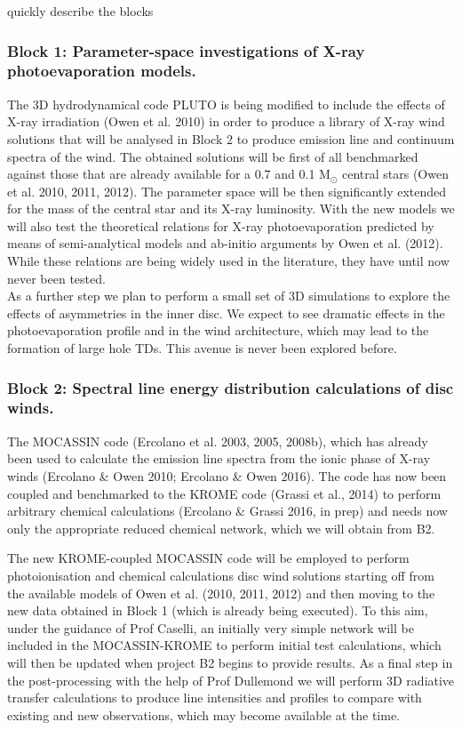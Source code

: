 \documentclass[10pt,fleqn,twoside]{article}
\begin{document}
{\color{red} quickly describe the blocks}

\subsubsection{Block 1: Parameter-space investigations of X-ray
  photoevaporation models.}

The 3D hydrodynamical code PLUTO is being modified to include the
effects of X-ray irradiation (Owen et al. 2010) in order to produce a
library of X-ray wind solutions that will be analysed in Block 2
to produce emission line and continuum spectra of the
wind. The obtained solutions will be first of all benchmarked against
those that are already available for a 0.7 and 0.1 M$_\odot$ central
stars (Owen et al. 2010, 2011, 2012). The parameter space will be then
significantly extended for the mass of the central star and its X-ray
luminosity. 
With the new models we will also test the theoretical relations for X-ray photoevaporation
predicted by means of semi-analytical models and ab-initio arguments
by Owen et al. (2012). While these relations are being widely used in
the literature, they have until now never been tested.\\
As a further step we plan to perform a small set of 3D simulations to explore the effects of asymmetries in the inner disc. We expect to see dramatic effects in the photoevaporation profile and in the wind architecture, which may lead to the formation of large hole TDs. This avenue is never been explored before.\\

\subsubsection{Block 2: Spectral line energy distribution calculations of disc winds.}
The MOCASSIN code (Ercolano et al. 2003, 2005, 2008b), which has
already been used to calculate the emission line spectra from the
ionic phase of X-ray winds (Ercolano \& Owen 2010; Ercolano \& Owen
2016). The code has now been coupled and benchmarked to 
the KROME code (Grassi et al., 2014) to perform arbitrary chemical calculations (Ercolano \&
Grassi 2016, in prep)  and needs now only the appropriate reduced
chemical network, which we will obtain from B2. 

The new KROME-coupled MOCASSIN code will be employed to perform
photoionisation and chemical calculations disc wind solutions starting
off from the available models of Owen et al. (2010, 2011, 2012) and
then moving to the new data obtained in Block 1 (which is 
already being executed). To this aim, under the guidance of Prof Caselli, an initially very
simple network will be included in the MOCASSIN-KROME to perform
initial test calculations, which will then be updated when project B2
begins to provide results. As a final step in the post-processing with
the help of Prof Dullemond 
we will perform 3D radiative
transfer calculations to produce line intensities and profiles to
compare with existing and new observations, which may become available
at the time. 
\end{document}
